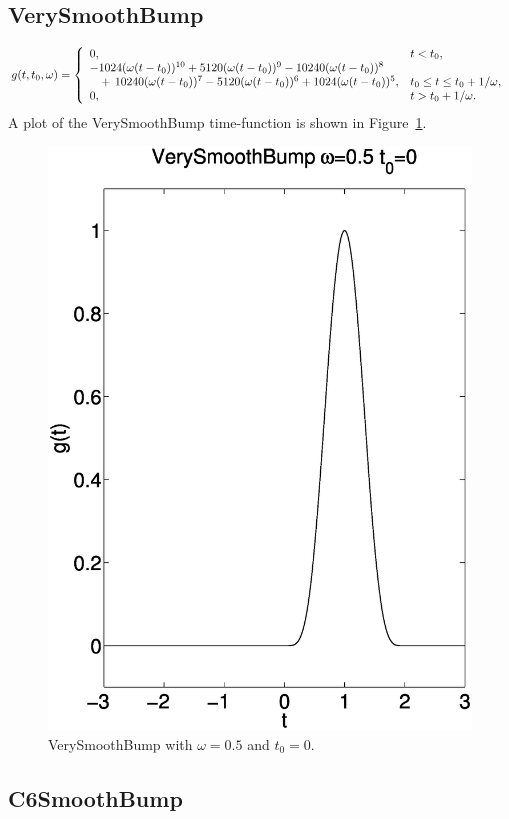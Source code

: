 \documentclass[11pt]{report}
\begin{document}
\subsection{VerySmoothBump} 
\[
g(t,t_0,\omega) = \left\{ 
\begin{array}{ll} 
0, & t <
t_0,\\ 
-1024(\omega(t-t_0))^{10}+5120(\omega(t-t_0))^9-10240(\omega(t-t_0))^8\\ 
\hphantom{-}+\,10240(\omega(t-t_0))^7-5120(\omega(t-t_0))^6+1024(\omega(t-t_0))^5,& t_0 \leq t \leq
t_0+1/\omega,\\ 
0, & t > t_0 + 1/\omega.
\end{array}
\right.
\]
A plot of the VerySmoothBump time-function is shown in Figure~\ref{fig:verysmoothbump}.
\begin{figure}
\begin{centering}
  \includegraphics[width=0.4\linewidth]{f11-verysmoothbump.ps}
  \caption{VerySmoothBump with $\omega=0.5$ and $t_0=0$.}
  \label{fig:verysmoothbump}
\end{centering}
\end{figure}  
%
\subsection{C6SmoothBump} 
%
\end{document}
